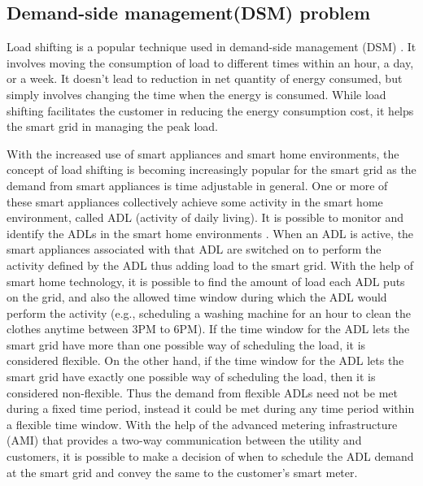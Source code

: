 
\subsection{Demand-side management(DSM) problem}
Load shifting is a popular technique used in demand-side management (DSM) \cite{DTU2010}. It involves moving the consumption of load to different times within an hour,  a day, or  a week. It doesn't lead to reduction in net quantity of energy consumed, but simply involves changing the time when the energy is consumed. While load shifting facilitates the customer in reducing the energy consumption cost, it helps the smart grid in managing the peak load.

With the increased use of smart appliances and smart home environments, the concept of load shifting is becoming increasingly popular for the smart grid as the demand from smart appliances is time adjustable in general. One or more of these smart appliances collectively achieve some activity in the smart home environment, called  ADL (activity of daily living). It is possible to monitor and identify the ADLs in the smart home environments \cite{GPG2016}. When an ADL is active, the smart appliances associated with that ADL are switched on to perform the activity defined by the ADL thus adding load to the smart grid. With the help of  smart home technology, it is possible to find the amount of load each ADL puts on the grid, and also the allowed time window during which the ADL would perform the activity (e.g., scheduling a  washing machine  for an hour to clean the clothes anytime between 3PM to 6PM).  If the time window for the ADL lets the smart grid have more than one possible way of scheduling the load, it is considered  flexible. On the other hand, if the time window for the ADL lets the smart grid have exactly one possible way of scheduling the load, then it is  considered  non-flexible. Thus the demand from  flexible ADLs need not be met during a fixed time period, instead it could be met during any time period within a flexible time window. With the help of the advanced metering infrastructure (AMI) that provides a two-way communication between the utility and customers, it is possible to make a decision of when to schedule the ADL demand at the smart grid and convey the same to the customer's smart meter. 

